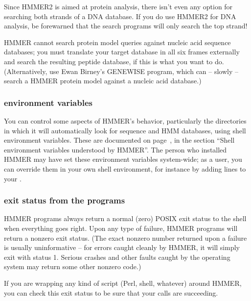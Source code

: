 Since HMMER2 is aimed at protein analysis, there isn't even any option
for searching both strands of a DNA database. If you do use HMMER2 for
DNA analysis, be forewarned that the search programs will only search
the top strand!

HMMER cannot search protein model queries against nucleic acid
sequence databases; you must translate your target database in all six
frames externally and search the resulting peptide database, if this
is what you want to do. (Alternatively, use Ewan Birney's GENEWISE
program, which can -- slowly -- search a HMMER protein model against a
nucleic acid database.)

\subsubsection{environment variables}

You can control some aspects of HMMER's behavior, particularly the
directories in which it will automatically look for sequence and HMM
databases, using shell environment variables. These are documented on
page~\pageref{section:environment}, in the section ``Shell environment
variables understood by HMMER''. The person who installed HMMER may
have set these environment variables system-wide; as a user, you can
override them in your own shell environment, for instance by adding
lines to your .

\subsubsection{exit status from the programs}

HMMER programs always return a normal (zero) POSIX exit status to the
shell when everything goes right. Upon any type of failure, HMMER
programs will return a nonzero exit status. (The exact nonzero number
returned upon a failure is usually uninformative -- for errors caught
cleanly by HMMER, it will simply exit with status 1. Serious crashes
and other faults caught by the operating system may return some other
nonzero code.)

If you are wrapping any kind of script (Perl, shell, whatever) around
HMMER, you can check this exit status to be sure that your calls are
succeeding.

